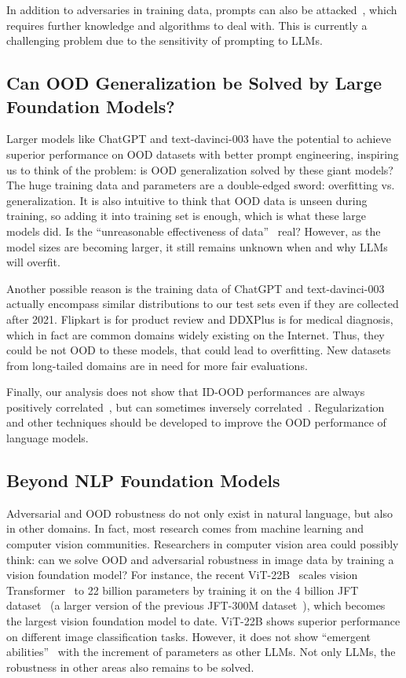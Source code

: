 \documentclass[11pt]{article}
\newcommand{\chat}{ChatGPT\xspace}
\newcommand{\flip}{Flipkart\xspace}
\newcommand{\ddx}{DDXPlus\xspace}
\begin{document}
In addition to adversaries in training data, prompts can also be attacked~\cite{maus2023adversarial}, which requires further knowledge and algorithms to deal with.
This is currently a challenging problem due to the sensitivity of prompting to LLMs.


\subsection{Can OOD Generalization be Solved by Large Foundation Models?}
\label{sec-discuss-ood}

Larger models like \chat and text-davinci-003 have the potential to achieve superior performance on OOD datasets with better prompt engineering, inspiring us to think of the problem: is OOD generalization solved by these giant models?
The huge training data and parameters are a double-edged sword: overfitting vs. generalization.
It is also intuitive to think that OOD data is unseen during training, so adding it into training set is enough, which is what these large models did.
Is the ``unreasonable effectiveness of data''~\cite{sun2017revisiting} real?
However, as the model sizes are becoming larger, it still remains unknown when and why LLMs will overfit.

Another possible reason is the training data of \chat and text-davinci-003 actually encompass similar distributions to our test sets even if they are collected after 2021.
\flip is for product review and \ddx is for medical diagnosis, which in fact are common domains widely existing on the Internet.
Thus, they could be not OOD to these models, that could lead to overfitting.
New datasets from long-tailed domains are in need for more fair evaluations.

Finally, our analysis does not show that ID-OOD performances are always positively correlated~\cite{miller2021accuracy}, but can sometimes inversely correlated~\cite{teney2022id}.
Regularization and other techniques should be developed to improve the OOD performance of language models.


\subsection{Beyond NLP Foundation Models}

Adversarial and OOD robustness do not only exist in natural language, but also in other domains.
In fact, most research comes from machine learning and computer vision communities.
Researchers in computer vision area could possibly think: can we solve OOD and adversarial robustness in image data by training a vision foundation model?
For instance, the recent ViT-22B~\cite{dehghani2023scaling} scales vision Transformer~\cite{dosovitskiy2020image} to 22 billion parameters by training it on the 4 billion JFT dataset~\cite{zhai2022scaling} (a larger version of the previous JFT-300M dataset~\cite{sun2017revisiting}), which becomes the largest vision foundation model to date.
ViT-22B shows superior performance on different image classification tasks.
However, it does not show ``emergent abilities''~\cite{wei2022emergent} with the increment of parameters as other LLMs.
Not only LLMs, the robustness in other areas also remains to be solved.
\end{document}
